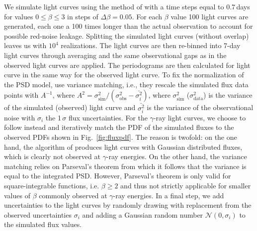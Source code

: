 \documentclass[twocolumn]{aastex62}
\newcommand{\gray}{$\gamma$-ray\xspace}
\begin{document}
We simulate light curves using the method of \citet{1995A&A...300..707T} with a time steps equal to 0.7\,days for values $0 \leqslant \beta \leqslant 3$ in steps of $\Delta\beta = 0.05$. For each $\beta$ value 100 light curves are generated, each one a 100 times longer than the actual observation to account for possible red-noise leakage. Splitting the simulated light curves (without overlap) leaves us with $10^4$ realizations. 
The light curves are then re-binned into 7-day light curves through averaging and the same observational gaps as in the observed light curves are applied. 
The periodograms are then calculated for light curve in the same way for the observed light curve.
To fix the normalization of the PSD model, \citet{2014MNRAS.445..437M} use variance matching, i.e., they rescale the simulated flux data points with $A^{-1}$, where $A^2 = \sigma_\mathrm{sim}^2 / (\sigma_\mathrm{obs}^2 - \bar{\sigma_i^2})$, where $\sigma_\mathrm{sim}^2$ ($\sigma_\mathrm{data}^2$) is the variance of the simulated (observed) light curve and $\bar{\sigma_i^2}$ is the variance of the observational noise with $\sigma_i$ the 1$\,\sigma$ flux uncertainties.
For the \gray light curves, we choose to follow \citet{2013MNRAS.433..907E} instead and iteratively match the PDF of the simulated fluxes to the observed PDFs shown in Fig.~\ref{fig:fluxpdf}. 
The reason is twofold: on the one hand, the algorithm of \citet{1995A&A...300..707T} produces light curves with Gaussian distributed fluxes, which is clearly not observed at \gray energies. On the other hand, the variance matching relies on Parseval's theorem from which it follows that the variance is equal to the integrated PSD. However, Parseval's theorem is only valid for square-integrable functions, i.e. $\beta \geqslant 2$ and thus not strictly applicable for smaller values of $\beta$ commonly observed at \gray energies.
In a final step, we add uncertainties to the light curves by randomly drawing with replacement from the observed uncertainties $\sigma_i$ and adding a Gaussian random number $\mathcal{N}(0,\sigma_i)$ to the simulated flux values.
\end{document}
